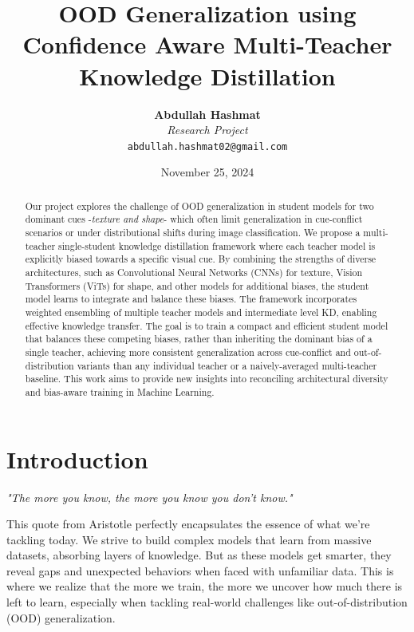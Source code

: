 \documentclass{article}
\title{OOD Generalization using Confidence Aware Multi-Teacher Knowledge Distillation}
\date{November 25, 2024}
\author{%
  \textbf{Abdullah Hashmat} \\
  \textit{Research Project}\\
  \texttt{abdullah.hashmat02@gmail.com} \\
  \text{\href{https://github.com/Hashmat02/Multi-Teacher-Single-Student-Confidence-Aware-Knowledge-Distillation}{GitHub Repository Link}}
}
\begin{document}
\maketitle

\begin{abstract}
Our project explores the challenge of OOD generalization in student models for two dominant cues -\textit{texture and shape}- which often limit generalization in cue-conflict scenarios or under distributional shifts during image classification. We propose a multi-teacher single-student knowledge distillation framework where each teacher model is explicitly biased towards a specific visual cue. By combining the strengths of diverse architectures, such as Convolutional Neural Networks (CNNs) for texture, Vision Transformers (ViTs) for shape, and other models for additional biases, the student model learns to integrate and balance these biases. The framework incorporates weighted ensembling of multiple teacher models and intermediate level KD, enabling effective knowledge transfer. The goal is to train a compact and efficient student model that balances these competing biases, rather than inheriting the dominant bias of a single teacher, achieving more consistent generalization across cue-conflict and out-of-distribution variants than any individual teacher or a naively-averaged multi-teacher baseline. This work aims to provide new insights into reconciling architectural diversity and bias-aware training in Machine Learning.
\end{abstract}

\section{Introduction}

\begin{center}
    \textit{"The more you know, the more you know you don't know."} \\
\end{center}


This quote from Aristotle perfectly encapsulates the essence of what we’re tackling today. We strive to build complex models that learn from massive datasets, absorbing layers of knowledge. But as these models get smarter, they reveal gaps and unexpected behaviors when faced with unfamiliar data. This is where we realize that the more we train, the more we uncover how much there is left to learn, especially when tackling real-world challenges like out-of-distribution (OOD) generalization. \\
\end{document}
